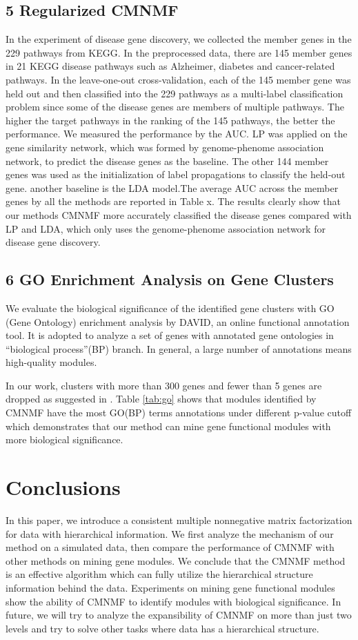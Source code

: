 \documentclass{bmcart}
\begin{document}
\subsection*{5 Regularized CMNMF}
In the experiment of disease gene discovery, we collected the member genes in the 229 pathways from KEGG. In the preprocessed data, there are 145 member genes in 21 KEGG disease pathways such as Alzheimer, diabetes and cancer-related pathways. In the leave-one-out cross-validation, each of the 145 member gene was held out and then classified into the 229 pathways as a multi-label classification problem since some of the disease genes are
members of multiple pathways. The higher the target pathways in the ranking of the 145 pathways, the better the performance. We measured the performance by the AUC. LP was applied on the gene similarity network, which was formed by genome-phenome association network, to predict the disease genes as the baseline. The other 144 member genes was used as the initialization of label propagations to classify the held-out gene. another baseline is the LDA model.The average AUC across the  member genes by all the methods are reported in Table x. The results clearly show that our methods CMNMF more accurately classified the disease genes compared with LP and LDA, which only uses the genome-phenome association network for disease gene discovery.
\subsection*{6 GO Enrichment Analysis on Gene Clusters}

We evaluate the biological significance of the identified gene clusters with GO (Gene Ontology) enrichment analysis by DAVID\cite{David}, an online functional annotation tool. It is adopted to analyze a set of genes with annotated gene ontologies in ``biological process''(BP) branch. In general, a large number of annotations means high-quality modules.

In our work, clusters with more than 300 genes and fewer than 5 genes are dropped as suggested in \cite{SMNMF}. Table \ref{tab:go} shows that modules identified by CMNMF have the most GO(BP) terms annotations under different p-value cutoff which demonstrates that our method can mine gene functional modules with more biological significance.

\section*{Conclusions}
In this paper, we introduce a consistent multiple nonnegative matrix factorization for data with hierarchical information. We first analyze the mechanism of our method on a simulated data, then compare the performance of CMNMF with other methods on mining gene modules. We conclude that the CMNMF method is an effective algorithm which can fully utilize the hierarchical structure information behind the data. Experiments on mining gene functional modules show the ability of CMNMF to identify modules with biological significance. In future, we will try to analyze the expansibility of CMNMF on more than just two levels and try to solve other tasks where data has a hierarchical structure.
\end{document}
